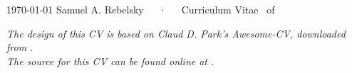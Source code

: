 \documentclass[11pt,letterpaper]{samr-cv}
\begin{document}

\begingroup
\renewcommand{\bibitem}[1]{}%
\endgroup

\vspace{-0.5in}
\makecvheader

\makecvfooter
  {\today}
  {Samuel A. Rebelsky~~~·~~~Curriculum Vitae}
  {\thepage\ of \pageref{LastPage}}












\vfill
\vhrulefill{0.1mm}
\begin{center}
\fontsize{8pt}{1em}\bodyfont\itshape\color{lighttext} The design of this CV is based on Claud D. Park's Awesome-CV, downloaded from
. \\
 The source for this CV can be found online at . \\
\end{center}
\end{document}

